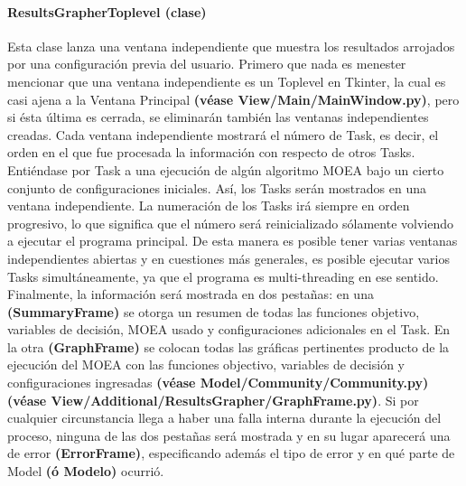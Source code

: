 \documentclass[class=report, crop=false]{standalone}
\begin{document}
\paragraph{ResultsGrapherToplevel (clase)}
\label{sec:a_3_3_3_1}
\begin{fulllineitems}

\begin{DUlineblock}{0em}
\item[] Esta clase lanza una ventana independiente que muestra los 
resultados arrojados por una configuración previa del usuario.\break
Primero que nada es menester mencionar que una ventana independiente 
es un Toplevel en Tkinter, la cual es casi ajena a la Ventana Principal 
\textbf{(véase View/Main/}\break\textbf{MainWindow.py)}, pero si ésta última es cerrada, 
se eliminarán también las ventanas independientes creadas.\medskip\break
Cada ventana independiente mostrará el número de Task, es decir, el 
orden en el que fue procesada la información con respecto de otros Tasks.\break
Entiéndase por Task a una ejecución de algún algoritmo MOEA bajo un 
cierto conjunto de configuraciones iniciales.\break
Así, los Tasks serán mostrados en una ventana independiente. La numeración 
de los Tasks irá siempre en orden progresivo, lo que significa que el número 
será reinicializado sólamente volviendo a ejecutar el programa principal.\break
De esta manera es posible tener varias ventanas independientes abiertas y 
en cuestiones más generales, es posible ejecutar varios Tasks simultáneamente, 
ya que el programa es multi-threading en ese sentido.\medskip\break
Finalmente, la información será mostrada en dos pestañas: en una 
\textbf{(SummaryFrame)} se otorga un resumen de todas las funciones objetivo, 
variables de decisión, MOEA usado y configuraciones adicionales en el Task.\break
En la otra \textbf{(GraphFrame)} se colocan todas las gráficas pertinentes 
producto de la ejecución del MOEA con las funciones objectivo, variables de 
decisión y configuraciones ingresadas \textbf{(véase Model/Community/Community.py)} \textbf{(véase View/}\break\textbf{Additional/ResultsGrapher/GraphFrame.py)}.\break
Si por cualquier circunstancia llega a haber una falla interna durante la 
ejecución del proceso, ninguna de las dos pestañas será mostrada y en su 
lugar aparecerá una de error \textbf{(ErrorFrame)}, especificando además 
el tipo de error y en qué parte de Model \textbf{(ó Modelo)} ocurrió.
\end{DUlineblock}


\end{fulllineitems}
\end{document}
